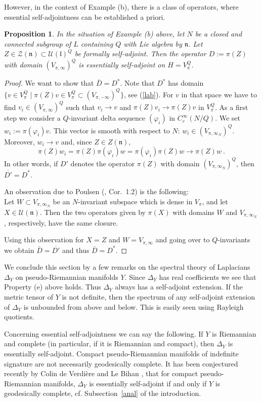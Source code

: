 \documentclass[10]{amsart}
\newtheorem{pro}[thm]{Proposition}
\theoremstyle{remark}
\theoremstyle{definition}
\numberwithin{equation}{section}
\newcommand{\fl}{{\mathfrak l}}
\newcommand{\fn}{{\mathfrak n}}
\newcommand{\vp}{\varphi}
\newcommand{\Cal}{\mathcal}
\begin{document}
{However, in the context of Example (b), there is a class of operators, where essential self-adjointness can be established a priori. 

\begin{pro}\label{spezi} In the situation of Example (b) above, let $N$ be a closed and connected subgroup of $L$ containing $Q$ with Lie algebra by $\fn$.
Let $Z\in{\Cal Z}(\fn)\subset {\Cal U}(\fl)^Q$ be formally self-adjoint. Then the operator $D:=\pi(Z)$ with domain $(V_{\pi,\infty})^Q$ is essentially self-adjoint on $H=V_\pi^Q$.
\end{pro}

\begin{proof} We want to show that $\bar D=D^*$. Note that $D^*$ has domain $\{v\in V_\pi^Q\mid \pi(Z)v\in V_\pi^Q\subset (V_{\pi,-\infty})^Q\}$, see (\ref{lab}). For $v$ in that space
we have to find $v_i \in (V_{\pi,\infty})^Q$ such that $v_i\to v$ {and} $\pi(Z)v_i\to \pi(Z)v$ in $V^Q_{\pi}$. As a first step we consider a $Q$-invariant delta sequence $(\vp_i)$
in $C_c^\infty (N/Q)$. We set $w_i:=\pi(\vp_i)v$. This vector is smooth with respect to $N$: $w_i\in (V_{\pi,\infty_N})^Q$. Moreover, $w_i\to v$ and, since $Z\in Z(\fn)$,
$$ \pi(Z)w_i=\pi(Z)\pi(\vp_i)w=\pi(\vp_i)\pi(Z)w\to \pi(Z)w\ .$$
In other words, if $D'$ denotes the operator $\pi(Z)$ with domain $(V_{\pi,\infty_N})^Q$, then $\overline{D'}=D^*$.

An observation due to Poulsen (\cite{Pou72}, Cor.~1.2) is the following: \\
Let $W\subset V_{\pi,\infty_N}$ be an $N$-invariant subspace which is dense in $V_\pi$, and let $X\in {\Cal U}(\fn)$. Then the two operators given by $\pi(X)$ with domains
$W$ and $V_{\pi,\infty_N}$, respectively, have the same closure.

Using this observation for $X=Z$ and $W=V_{\pi,\infty}$ and going over to $Q$-invariants we obtain $\bar D= \overline{D'}$ and thus $\bar D=D^*$.
\end{proof} 

We conclude this section by a few remarks on the spectral theory of Laplacians $\Delta_Y$  on pseudo-Riemannian manifolds $Y$. Since $\Delta_Y$ has real coefficients
we see that Property (e) above holds. Thus $\Delta_Y$ always has a self-adjoint extension. If the metric tensor of $Y$ is not definite, then the spectrum
of any self-adjoint extension of  $\Delta_Y$ is unbounded from above and below. This is easily seen using Rayleigh quotients.

Concerning essential self-adjointness we can say the following. If $Y$ is Riemannian and complete (in particular, if it is Riemannian and compact), then $\Delta_Y$ is essentially self-adjoint. Compact pseudo-Riemannian manifolds of indefinite signature are not necessarily geodesically complete. It has been conjectured recently by Colin de Verdi\`ere and Le Bihan \cite{CL22}, that for compact pseudo-Riemannian manifolds, $\Delta_Y$ is essentially self-adjoint if and only if $Y$ is geodesically complete, cf. Subsection~\ref{anal} of the introduction. 
}
\end{document}
